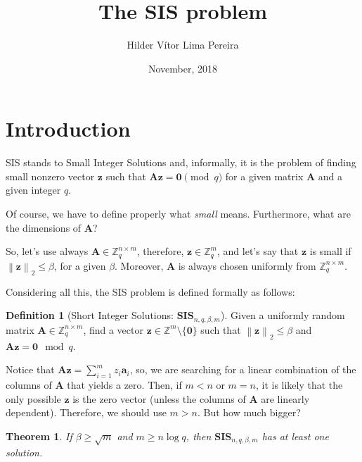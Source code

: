 \documentclass[a4paper,11pt]{article}
\title{The SIS problem}
\author{Hilder Vítor Lima Pereira}
\date{November, 2018}
\let\vec\mathbf %
\newcommand\Zqm{{\mathbb Z}_q^m}
\newcommand\Zm{{\mathbb Z}^m}
\newcommand\Zqnm{{\mathbb Z}_q^{n\times m}}
\newcommand\A{{\mathbf A}}
\newcommand\SIS{\textbf{SIS}_{n, q, \beta, m}}
\newcommand{\norm}[1]{\left\lVert #1 \right\rVert_2}
\newtheorem{theorem}{Theorem}[section]
\theoremstyle{definition}
\newtheorem{definition}{Definition}[section]
\theoremstyle{remark}
\begin{document}
\maketitle


\section{Introduction}

SIS stands to Small Integer Solutions and, informally, it is the problem of
finding small nonzero vector $\vec{z}$ such that $\vec{ A z} = \vec{0} \pmod q$
for a given matrix $\A$ and a given integer $q$.

Of course, we have to define properly what \emph{small} means. Furthermore,
what are the dimensions of $\A$?

So, let's use always $\A \in \Zqnm$, therefore, $\vec z \in \Zqm$, and let's
say that $\vec z$ is small if $\norm{\vec z} \le \beta$, for a given $\beta$.
Moreover, $\A$ is always chosen uniformly from $\Zqnm$.

Considering all this, the SIS problem is defined formally as follows:

\begin{definition}[Short Integer Solutions: $\SIS$] Given a uniformly random
matrix $\A \in \Zqnm$, find a vector $\vec z \in \Zm \setminus \{\vec 0\} $
such that
$\norm{\vec z} \le \beta$ and $\A \vec z = \vec 0 \mod q$.
\end{definition}

Notice that $\A \vec z = \sum_{i=1}^{m} z_i \vec{a}_i$, so, we are searching
for a linear combination of the columns of $\A$ that yields a zero. Then, if
$m<n$ or $m=n$, it is likely that the only possible $\vec z$ is the zero vector
(unless the columns of $\A$ are linearly dependent). Therefore, we should use
$m > n$. But how much bigger?

\begin{theorem}
If $\beta\ge \sqrt{m}$ and $m \ge n\log q$, then $\SIS$ has at least one 
solution.
\end{theorem}
\end{document}
